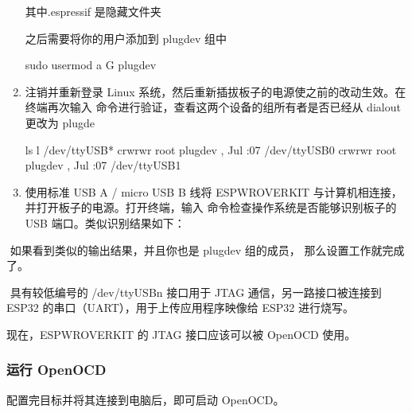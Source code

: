 \documentclass[a4paper,12pt,english]{sphinxmanual}
\begin{document}
\begin{enumerate}
\sphinxAtStartPar
其中.espressif 是隐藏文件夹

\sphinxAtStartPar
之后需要将你的用户添加到 plugdev 组中

\begin{sphinxVerbatim}[commandchars=\\\{\}]
sudo usermod \PYGZhy{}a \PYGZhy{}G plugdev 
\end{sphinxVerbatim}

\item {} 
\sphinxAtStartPar
注销并重新登录 Linux 系统，然后重新插拔板子的电源使之前的改动生效。在终端再次输入  命令进行验证，查看这两个设备的组所有者是否已经从 dialout 更改为 plugde

\begin{sphinxVerbatim}[commandchars=\\\{\}]
ls \PYGZhy{}l /dev/ttyUSB*
crw\PYGZhy{}rw\PYGZhy{}r\PYGZhy{}\PYGZhy{}  root plugdev ,  Jul  :07 /dev/ttyUSB0
crw\PYGZhy{}rw\PYGZhy{}r\PYGZhy{}\PYGZhy{}  root plugdev ,  Jul  :07 /dev/ttyUSB1
\end{sphinxVerbatim}

\item {} 
\sphinxAtStartPar
使用标准 USB A / micro USB B 线将 ESP\sphinxhyphen{}WROVER\sphinxhyphen{}KIT 与计算机相连接，并打开板子的电源。打开终端，输入  命令检查操作系统是否能够识别板子的 USB 端口。类似识别结果如下：

\end{enumerate}

\sphinxAtStartPar
​ 如果看到类似的输出结果，并且你也是 plugdev 组的成员， 那么设置工作就完成了。

\sphinxAtStartPar
​ 具有较低编号的 /dev/ttyUSBn 接口用于 JTAG 通信，另一路接口被连接到 ESP32 的串口（UART），用于上传应用程序映像给 ESP32 进行烧写。

\sphinxAtStartPar
现在，ESP\sphinxhyphen{}WROVER\sphinxhyphen{}KIT 的 JTAG 接口应该可以被 OpenOCD 使用。


\subsubsection{运行 OpenOCD}
\label{\detokenize{exp-esp32/ide/esp-idf-cli-debug:id4}}
\sphinxAtStartPar
配置完目标并将其连接到电脑后，即可启动 OpenOCD。
\end{document}
